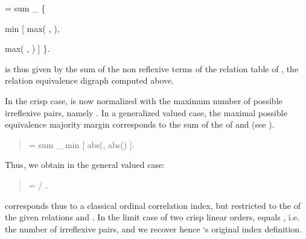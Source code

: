 \documentclass[a4paper,10pt,english]{sphinxhowto}
\begin{document}
\begin{DUlineblock}{0em}
\item[]  = sum \_  \{ 
\item[]
\begin{DUlineblock}{\DUlineblockindent}
\item[] min {[} max( ,  ), 
\item[]
\begin{DUlineblock}{\DUlineblockindent}
\item[] max( ,  ) {]} \}.
\end{DUlineblock}
\end{DUlineblock}
\end{DUlineblock}

 is thus given by the sum of the non reflexive terms of the relation table of , the relation equivalence digraph computed above.

In the crisp case,   is now normalized with the maximum number of possible irreflexive pairs, namely . In a generalized \sphinxhyphen{}valued case, the maximal possible equivalence majority margin  corresponds to the sum  of the  of  and  (see ).
\begin{quote}

 = sum \_  min {[} abs(, abs() {]}.
\end{quote}

Thus, we obtain in the general  \sphinxhyphen{}valued case:
\begin{quote}

 =   /  .
\end{quote}

 corresponds thus to a classical ordinal correlation index, but restricted to the  of the given relations  and . In the limit case of two crisp linear orders,  equals , i.e. the number of irreflexive pairs, and we recover hence  ‘s original  index definition.
\end{document}
